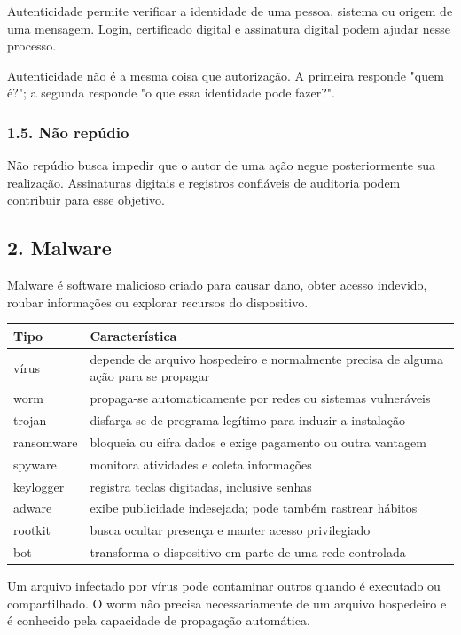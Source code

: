 \documentclass[11pt,a4paper]{article}
\begin{document}
Autenticidade permite verificar a identidade de uma pessoa, sistema ou origem de uma mensagem. Login, certificado digital e assinatura digital podem ajudar nesse processo.

Autenticidade não é a mesma coisa que autorização. A primeira responde "quem é?"; a segunda responde "o que essa identidade pode fazer?".

\subsubsection*{1.5. Não repúdio}

Não repúdio busca impedir que o autor de uma ação negue posteriormente sua realização. Assinaturas digitais e registros confiáveis de auditoria podem contribuir para esse objetivo.

\subsection*{2. Malware}

Malware é software malicioso criado para causar dano, obter acesso indevido, roubar informações ou explorar recursos do dispositivo.

\begin{tabularx}{\linewidth}{lX}
\toprule
 \textbf{Tipo} & \textbf{Característica} \\
\midrule
 vírus & depende de arquivo hospedeiro e normalmente precisa de alguma ação para se propagar \\
 worm & propaga-se automaticamente por redes ou sistemas vulneráveis \\
 trojan & disfarça-se de programa legítimo para induzir a instalação \\
 ransomware & bloqueia ou cifra dados e exige pagamento ou outra vantagem \\
 spyware & monitora atividades e coleta informações \\
 keylogger & registra teclas digitadas, inclusive senhas \\
 adware & exibe publicidade indesejada; pode também rastrear hábitos \\
 rootkit & busca ocultar presença e manter acesso privilegiado \\
 bot & transforma o dispositivo em parte de uma rede controlada \\
\bottomrule
\end{tabularx}


Um arquivo infectado por vírus pode contaminar outros quando é executado ou compartilhado. O worm não precisa necessariamente de um arquivo hospedeiro e é conhecido pela capacidade de propagação automática.
\end{document}

